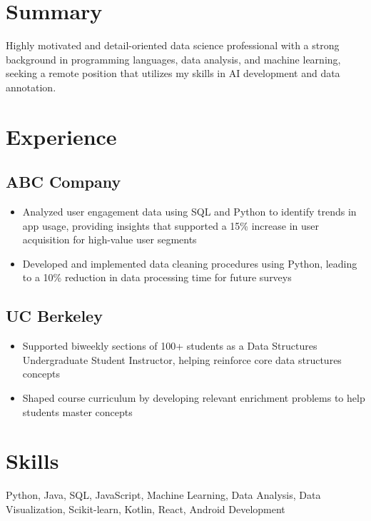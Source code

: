 \documentclass[11pt]{article}
\begin{document}
\section*{Summary}
Highly motivated and detail-oriented data science professional with a strong background in programming languages, data analysis, and machine learning, seeking a remote position that utilizes my skills in AI development and data annotation.

\section*{Experience}
\subsection*{ABC Company}
\begin{itemize}
\item Analyzed user engagement data using SQL and Python to identify trends in app usage, providing insights that supported a 15\% increase in user acquisition for high-value user segments
\item Developed and implemented data cleaning procedures using Python, leading to a 10\% reduction in data processing time for future surveys
\end{itemize}

\subsection*{UC Berkeley}
\begin{itemize}
\item Supported biweekly sections of 100+ students as a Data Structures Undergraduate Student Instructor, helping reinforce core data structures concepts
\item Shaped course curriculum by developing relevant enrichment problems to help students master concepts
\end{itemize}

\section*{Skills}
Python, Java, SQL, JavaScript, Machine Learning, Data Analysis, Data Visualization, Scikit-learn, Kotlin, React, Android Development
\end{document}

